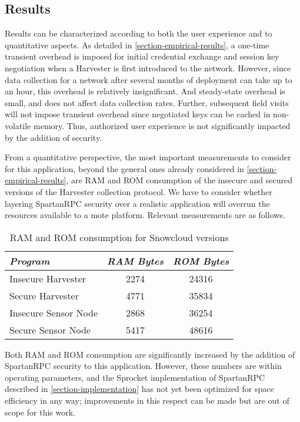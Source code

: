\subsection{Results}

Results can be characterized according to both the user experience and
to quantitative aspects. As detailed in
\autoref{section-empirical-results}, a one-time transient overhead is
imposed for initial credential exchange and session key negotiation
when a Harvester is first introduced to the network. However, since
data collection for a network after several months of deployment can
take up to an hour, this overhead is relatively insignificant. And
steady-state overhead is small, and does not affect data collection
rates. Further, subsequent field visits will not impose transient
overhead since negotiated keys can be cached in non-volatile
memory. Thus, authorized user experience is not significantly impacted
by the addition of security.

From a quantitative perspective, the most important measurements to
consider for this application, beyond the general ones already
considered in \autoref{section-empirical-results}, are RAM and ROM
consumption of the insecure and secured versions of the Harvester
collection protocol. We have to consider whether layering SpartanRPC
security over a realistic application will overrun the resources
available to a mote platform. Relevant measurements are as follows.
\begin{table}[h]
\centering \newcommand\T{\rule{0pt}{2.1ex}} \caption{RAM and ROM
  consumption for Snowcloud versions} {
\begin{tabular}{|l|c|c|}
\hline
\emph{Program} \T & \emph{RAM Bytes} & \emph{ROM Bytes} \\ \hline\hline
Insecure Harvester \T & 2274 & 24316 \\ \hline
Secure Harvester \T & 4771 & 35834 \\ \hline
Insecure Sensor Node \T & 2868 & 36254 \\ \hline
Secure Sensor Node \T & 5417 & 48616 \\ \hline
\end{tabular}
}
\label{table-snowcloud}
\end{table}

Both RAM and ROM consumption are significantly increased by the
addition of SpartanRPC security to this application. 
However, these numbers are within operating parameters, and the
Sprocket implementation of SpartanRPC described in
\autoref{section-implementation} has not yet been optimized for space
efficiency in any way; improvements in this respect can be made but
are out of scope for this work.


